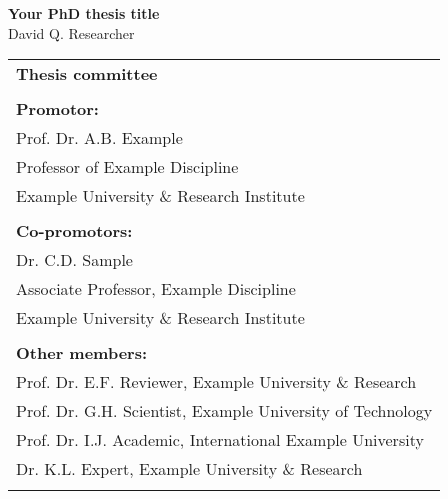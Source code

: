 \thispagestyle{empty}
\begin{center}
\Huge{\textbf{Your PhD thesis title}} \\
\vspace*{1cm}
\vspace*{1cm}
\vspace*{\fill}
\large{David Q. Researcher}\\
\end{center}

\newpage
\thispagestyle{empty}
\vspace*{\fill}
\begin{tabular}{l}
    \textbf{Thesis committee}                                                                 \\  
                                                                                              \\  
    \textbf{Promotor:}                                                                        \\
    Prof. Dr. A.B. Example                                                                 \\
    Professor of Example Discipline                                                   \\
    Example University \& Research Institute                                                   \\
                                                                                              \\  
    \textbf{Co-promotors:}                                                                    \\
    Dr. C.D. Sample                                                                    \\
    Associate Professor, Example Discipline                             \\
    Example University \& Research Institute                                           \\
                                                                                              \\  

    \textbf{Other members:}                                                                   \\
    Prof. Dr. E.F. Reviewer, Example University \& Research          \\
    Prof. Dr. G.H. Scientist, Example University of Technology                   \\
    Prof. Dr. I.J. Academic, International Example University                                   \\
    Dr. K.L. Expert, Example University \& Research                                  \\
    \\  


\end{tabular}
